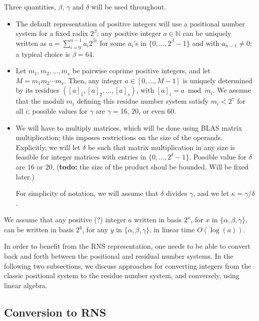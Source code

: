 \documentclass[acmtoms]{acmsmall}
\def\N{\mathbb{N}}
\newcommand{\todo}[1]{(\textbf{todo:} #1)}
\begin{document}
Three quantities, $\beta$, $\gamma$ and $\delta$ will be used throughout.
\begin{itemize}
\item The default representation of positive integers will use a
  positional number system for a fixed radix $2^\beta$: any positive
  integer $a \in \N$ can be uniquely written as $a = \sum_{i=0}^{n-1}
  a_i2^{\beta i}$ for some $a_i$'s in $\{0,\dots,2^\beta-1\}$ and with
  $a_{n-1} \ne 0$; a typical choice is $\beta=64$. 

\item Let $m_1, m_2, \dots, m_s$ be pairwise coprime positive
  integers, and let $M = m_1 m_2 \cdots m_s$. Then, any integer $a\in
  [0,\hdots,M-1]$ is uniquely determined by its residues $( [a]_1,
  [a]_2, \dots, [a]_s)$, with $[a]_i = a \bmod m_i$.  We assume that
  the moduli $m_i$ defining this residue number system satisfy $m_i
  < 2^\gamma$ for all $i$; possible values for $\gamma$ are
  $\gamma=16$, $20$, or even $60$. 

\item We will have to multiply matrices, which will be done using BLAS
  matrix multiplication; this imposes restrictions on the size of the
  operands. Explicitly, we will let $\delta$ be such that matrix
  multiplication in any size is feasible for integer matrices with
  entries in $\{0,\dots,2^\delta-1\}$. Possible value for
  $\delta$ are $16$ or $20$. 
  \todo{the size of the product shoul be bounded. Will be fixed later.}
  
  For simplicity of notation, we will assume that $\delta$ divides $\gamma$,
  and we let $\kappa=\gamma/\delta$.
\end{itemize}
We assume that any positive (?) integer $a$ written in basis $2^x$, for
$x$ in $\{\alpha,\beta,\gamma\}$, can be written in basis $2^y$,
for any $y$ in $\{\alpha,\beta,\gamma\}$, in linear time $O(\log(a))$.

In order to benefit from the RNS representation, one needs to be able
to convert back and forth between the positional and residual number
systems. In the following two subsections, we discuss approaches for
converting integers from the classic positional system to the residue
number system, and conversely, using linear algebra.


\subsection{Conversion to RNS}
\end{document}
